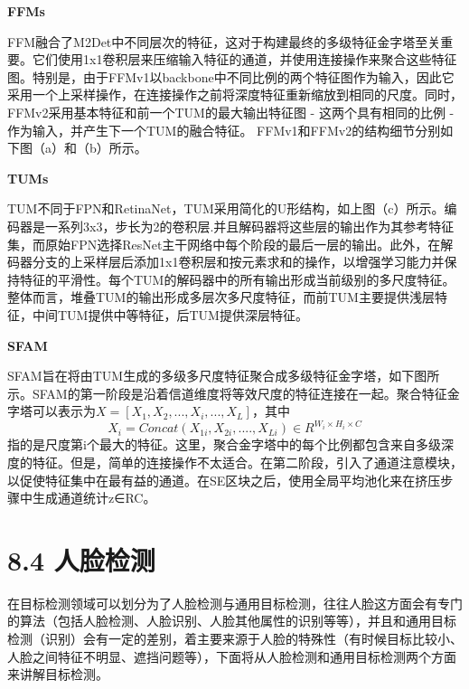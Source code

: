 \begin{figure}
\centering
\caption{}
\end{figure}

\textbf{FFMs}

FFM融合了M2Det中不同层次的特征，这对于构建最终的多级特征金字塔至关重要。它们使用1x1卷积层来压缩输入特征的通道，并使用连接操作来聚合这些特征图。特别是，由于FFMv1以backbone中不同比例的两个特征图作为输入，因此它采用一个上采样操作，在连接操作之前将深度特征重新缩放到相同的尺度。同时，FFMv2采用基本特征和前一个TUM的最大输出特征图
- 这两个具有相同的比例 - 作为输入，并产生下一个TUM的融合特征。
FFMv1和FFMv2的结构细节分别如下图（a）和（b）所示。

\begin{figure}
\centering
\caption{}
\end{figure}

\textbf{TUMs}

TUM不同于FPN和RetinaNet，TUM采用简化的U形结构，如上图（c）所示。编码器是一系列3x3，步长为2的卷积层.并且解码器将这些层的输出作为其参考特征集，而原始FPN选择ResNet主干网络中每个阶段的最后一层的输出。此外，在解码器分支的上采样层后添加1x1卷积层和按元素求和的操作，以增强学习能力并保持特征的平滑性。每个TUM的解码器中的所有输出形成当前级别的多尺度特征。整体而言，堆叠TUM的输出形成多层次多尺度特征，而前TUM主要提供浅层特征，中间TUM提供中等特征，后TUM提供深层特征。

\textbf{SFAM}

SFAM旨在将由TUM生成的多级多尺度特征聚合成多级特征金字塔，如下图所示。SFAM的第一阶段是沿着信道维度将等效尺度的特征连接在一起。聚合特征金字塔可以表示为\(X = [X_1,X_2,...,X_i,...,X_L]\)，其中
\[X_i = Concat(X_{1i}, X_{2i}, ...., X_{Li}) \in R^{W_i \times H_i \times C}\]
指的是尺度第i个最大的特征。这里，聚合金字塔中的每个比例都包含来自多级深度的特征。但是，简单的连接操作不太适合。在第二阶段，引入了通道注意模块，以促使特征集中在最有益的通道。在SE区块之后，使用全局平均池化来在挤压步骤中生成通道统计z∈RC。

\begin{figure}
\centering
\caption{}
\end{figure}

\section{8.4 人脸检测}\label{ux4ebaux8138ux68c0ux6d4b}

在目标检测领域可以划分为了人脸检测与通用目标检测，往往人脸这方面会有专门的算法（包括人脸检测、人脸识别、人脸其他属性的识别等等），并且和通用目标检测（识别）会有一定的差别，着主要来源于人脸的特殊性（有时候目标比较小、人脸之间特征不明显、遮挡问题等），下面将从人脸检测和通用目标检测两个方面来讲解目标检测。

